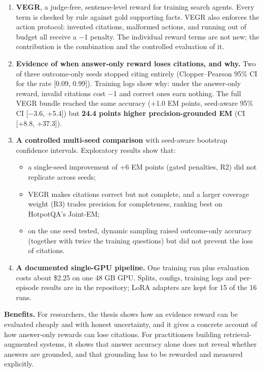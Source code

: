 \begin{enumerate}
\def\labelenumi{\arabic{enumi}.}
\tightlist
\item
  \textbf{VEGR}, a judge-free, sentence-level reward for training search
  agents. Every term is checked by rule against gold supporting facts.
  VEGR also enforces the action protocol: invented citations, malformed
  actions, and running out of budget all receive a −1 penalty. The
  individual reward terms are not new; the contribution is the
  combination and the controlled evaluation of it.
\item
  \textbf{Evidence of when answer-only reward loses citations, and why.}
  Two of three outcome-only seeds stopped citing entirely
  (Clopper--Pearson 95\% CI for the rate {[}0.09, 0.99{]}). Training
  logs show why: under the answer-only reward, invalid citations cost −1
  and correct ones earn nothing. The full VEGR bundle reached the same
  accuracy (+1.0 EM points, seed-aware 95\% CI {[}−3.6, +5.4{]}) but
  \textbf{24.4 points higher precision-grounded EM} (CI {[}+8.8,
  +37.3{]}).
\item
  \textbf{A controlled multi-seed comparison} with seed-aware bootstrap
  confidence intervals. Exploratory results show that:

  \begin{itemize}
  \tightlist
  \item
    a single-seed improvement of +6 EM points (gated penalties, R2) did
    not replicate across seeds;
  \item
    VEGR makes citations correct but not complete, and a larger coverage
    weight (R3) trades precision for completeness, ranking best on
    HotpotQA's Joint-EM;
  \item
    on the one seed tested, dynamic sampling raised outcome-only
    accuracy (together with twice the training questions) but did not
    prevent the loss of citations.
  \end{itemize}
\item
  \textbf{A documented single-GPU pipeline.} One training run plus
  evaluation costs about \$2.25 on one 48 GB GPU. Splits, configs,
  training logs and per-episode results are in the repository; LoRA
  adapters are kept for 15 of the 16 runs.
\end{enumerate}

\textbf{Benefits.} For researchers, the thesis shows how an evidence
reward can be evaluated cheaply and with honest uncertainty, and it
gives a concrete account of how answer-only rewards can lose citations.
For practitioners building retrieval-augmented systems, it shows that
answer accuracy alone does not reveal whether answers are grounded, and
that grounding has to be rewarded and measured explicitly.

